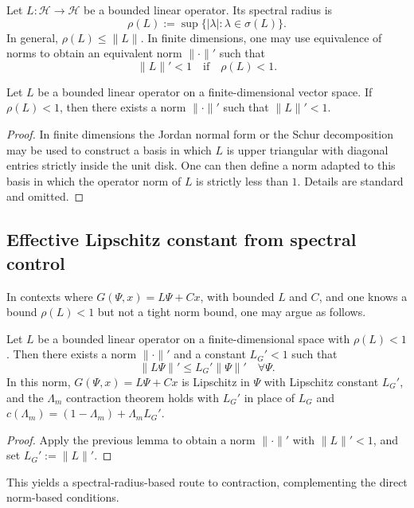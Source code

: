 \documentclass[11pt]{article}
\begin{document}
Let $L : \mathcal{H} \to \mathcal{H}$ be a bounded linear operator. Its spectral radius is
\[
  \rho(L) := \sup\{ |\lambda| : \lambda \in \sigma(L)\}.
\]
In general, $\rho(L) \leq \|L\|$. In finite dimensions, one may use equivalence of norms to obtain an equivalent norm $\|\cdot\|'$ such that
\[
  \|L\|' < 1
\quad \text{if} \quad
  \rho(L) < 1.
\]

\begin{lemma}
Let $L$ be a bounded linear operator on a finite-dimensional vector space. If $\rho(L) < 1$, then there exists a norm $\|\cdot\|'$ such that $\|L\|' < 1$.
\end{lemma}

\begin{proof}
In finite dimensions the Jordan normal form or the Schur decomposition may be used to construct a basis in which $L$ is upper triangular with diagonal entries strictly inside the unit disk. One can then define a norm adapted to this basis in which the operator norm of $L$ is strictly less than $1$. Details are standard and omitted.
\end{proof}

\subsection{Effective Lipschitz constant from spectral control}

In contexts where $G(\Psi,x) = L\Psi + Cx$, with bounded $L$ and $C$, and one knows a bound $\rho(L) < 1$ but not a tight norm bound, one may argue as follows.

\begin{lemma}
Let $L$ be a bounded linear operator on a finite-dimensional space with $\rho(L) < 1$. Then there exists a norm $\|\cdot\|'$ and a constant $L_G' < 1$ such that
\[
  \|L\Psi\|' \leq L_G' \|\Psi\|'
  \quad \forall \Psi.
\]
In this norm, $G(\Psi,x) = L\Psi + Cx$ is Lipschitz in $\Psi$ with Lipschitz constant $L_G'$, and the $\Lambda_m$ contraction theorem holds with $L_G'$ in place of $L_G$ and $c(\Lambda_m) = (1 - \Lambda_m) + \Lambda_m L_G'$.
\end{lemma}

\begin{proof}
Apply the previous lemma to obtain a norm $\|\cdot\|'$ with $\|L\|' < 1$, and set $L_G' := \|L\|'$.
\end{proof}

This yields a spectral-radius-based route to contraction, complementing the direct norm-based conditions.
\end{document}
